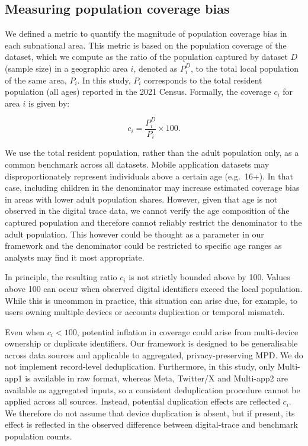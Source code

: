 \documentclass[]{rsos}%
\begin{document}
\subsection{Measuring population coverage bias}\label{measuring-population-coverage-bias}

We defined a metric to quantify the magnitude of population coverage
bias in each subnational area. This metric is based on the population
coverage of the dataset, which we compute as the ratio of the population
captured by dataset \(D\) (sample size) in a geographic area \(i\), denoted
as \(P_i^D\), to the total local population of the same area, \(P_i\). In
this study, \(P_i\) corresponds to the total resident population (all
ages) reported in the 2021 Census. Formally, the coverage \(c_i\) for area
\(i\) is given by:

\begin{equation}
c_i = \dfrac{P_i^D}{P_i} \times 100.
\end{equation}

We use the total resident population, rather than the adult population
only, as a common benchmark across all datasets. Mobile application
datasets may disproportionately represent individuals above a certain
age (e.g.~16+). In that case, including children in the denominator may
increase estimated coverage bias in areas with lower adult population
shares. However, given that age is not observed in the digital trace
data, we cannot verify the age composition of the captured population
and therefore cannot reliably restrict the denominator to the adult
population. This however could be thought as a parameter in our
framework and the denominator could be restricted to specific age ranges
as analysts may find it most appropriate.

In principle, the resulting ratio \(c_i\) is not strictly bounded above by
100. Values above 100 can occur when observed digital identifiers exceed
the local population. While this is uncommon in practice, this situation
can arise due, for example, to users owning multiple devices or accounts
duplication or temporal mismatch.

Even when \(c_i<100\), potential inflation in coverage could arise from
multi-device ownership or duplicate identifiers. Our framework is
designed to be generalisable across data sources and applicable to
aggregated, privacy-preserving MPD. We do not implement record-level
deduplication. Furthermore, in this study, only Multi-app1 is available
in raw format, whereas Meta, Twitter/X and Multi-app2 are available as
aggregated inputs, so a consistent deduplication procedure cannot be
applied across all sources. Instead, potential duplication effects are
reflected \(c_i\). We therefore do not assume that device duplication is
absent, but if present, its effect is reflected in the observed
difference between digital-trace and benchmark population counts.
\end{document}
